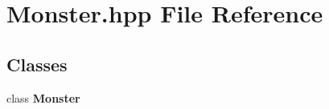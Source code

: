 \section{Monster.\-hpp File Reference}
\label{_monster_8hpp}
\subsection*{Classes}
\begin{DoxyCompactItemize}
\item 
class {\bf Monster}
\end{DoxyCompactItemize}
